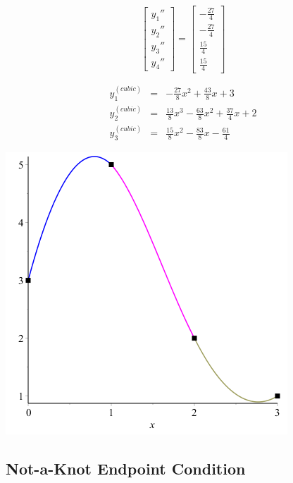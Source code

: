 \documentclass[11pt]{article} %
\begin{document}
$$
\begin{bmatrix} y_1'' \\ y_2'' \\ y_3'' \\ y_4'' \end{bmatrix} = 
\begin{bmatrix} -\frac{27}{4} \\ -\frac{27}{4} \\\frac{15}{4} \\ \frac{15}{4}\end{bmatrix}$$

$$\begin{array}{lclcl} y^{(cubic)}_1 & = &  - \frac{27}{8}x^2 + \frac{43}{8} x + 3  \\
		        y^{(cubic)}_2  & = & \frac{13}{8}x^3 - \frac{63}{8}x^2 + \frac{37}{4}x + 2 \\
		        y^{(cubic)}_3  & = & \frac{15}{8}x^2 - \frac{83}{8}x - \frac{61}{4} 
\end{array}$$

\begin{center}
\includegraphics[scale=.5]{plots/problem4plot4.png}
\end{center}





\subsection*{Not-a-Knot Endpoint Condition}
\end{document}
